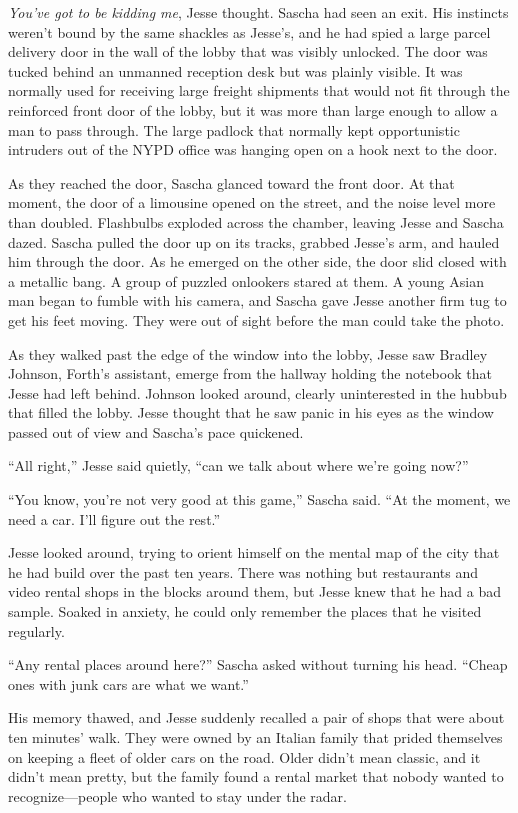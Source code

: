 \documentclass[12pt]{book}
\begin{document}
\emph{You've got to be kidding me}, Jesse thought.  Sascha had seen an exit.  His instincts weren't bound by the same shackles as Jesse's, and he had spied a large parcel delivery door in the wall of the lobby that was visibly unlocked.  The door was tucked behind an unmanned reception desk but was plainly visible.  It was normally used for receiving large freight shipments that would not fit through the reinforced front door of the lobby, but it was more than large enough to allow a man to pass through.  The large padlock that normally kept opportunistic intruders out of the NYPD office was hanging open on a hook next to the door.

As they reached the door, Sascha glanced toward the front door.  At that moment, the door of a limousine opened on the street, and the noise level more than doubled.  Flashbulbs exploded across the chamber, leaving Jesse and Sascha dazed.  Sascha pulled the door up on its tracks, grabbed Jesse's arm, and hauled him through the door.  As he emerged on the other side, the door slid closed with a metallic bang.  A group of puzzled onlookers stared at them.  A young Asian man began to fumble with his camera, and Sascha gave Jesse another firm tug to get his feet moving.  They were out of sight before the man could take the photo.

As they walked past the edge of the window into the lobby, Jesse saw Bradley Johnson, Forth's assistant, emerge from the hallway holding the notebook that Jesse had left behind.  Johnson looked around, clearly uninterested in the hubbub that filled the lobby.  Jesse thought that he saw panic in his eyes as the window passed out of view and Sascha's pace quickened.

``All right,'' Jesse said quietly, ``can we talk about where we're going now?''

``You know, you're not very good at this game,'' Sascha said.  ``At the moment, we need a car.  I'll figure out the rest.''

Jesse looked around, trying to orient himself on the mental map of the city that he had build over the past ten years.  There was nothing but restaurants and video rental shops in the blocks around them, but Jesse knew that he had a bad sample.  Soaked in anxiety, he could only remember the places that he visited regularly.

``Any rental places around here?'' Sascha asked without turning his head.  ``Cheap ones with junk cars are what we want.''

His memory thawed, and Jesse suddenly recalled a pair of shops that were about ten minutes' walk.  They were owned by an Italian family that prided themselves on keeping a fleet of older cars on the road.  Older didn't mean classic, and it didn't mean pretty, but the family found a rental market that nobody wanted to recognize---people who wanted to stay under the radar.
\end{document}
